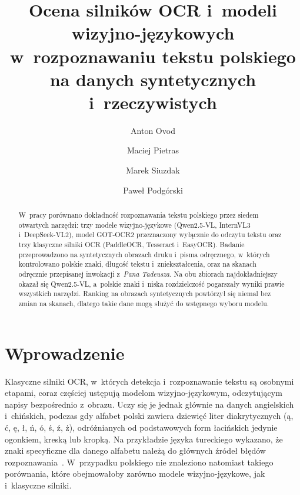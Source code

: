 \documentclass[runningheads,orivec]{llncs}
\begin{document}
\setlength{\emergencystretch}{1.5em}

\title{Ocena silników OCR i~modeli wizyjno-językowych w~rozpoznawaniu tekstu polskiego na danych syntetycznych i~rzeczywistych}
\author{Anton Ovod \and Maciej Pietras \and Marek Siuzdak \and Paweł Podgórski}

\maketitle

\begin{abstract}
W~pracy porównano dokładność rozpoznawania tekstu polskiego przez siedem otwartych narzędzi: trzy modele
wizyjno-językowe (\mbox{Qwen2.5-VL}, InternVL3 i~\mbox{DeepSeek-VL2}), model \mbox{GOT-OCR2} przeznaczony wyłącznie do odczytu tekstu oraz trzy klasyczne silniki OCR (PaddleOCR, Tesseract i~EasyOCR). Badanie przeprowadzono na syntetycznych obrazach druku i~pisma odręcznego, w~których kontrolowano polskie znaki, długość tekstu i~zniekształcenia, oraz na skanach odręcznie przepisanej inwokacji z~\emph{Pana Tadeusza}. Na obu zbiorach najdokładniejszy okazał się \mbox{Qwen2.5-VL}, a~polskie znaki i~niska rozdzielczość pogarszały wyniki prawie wszystkich narzędzi. Ranking na obrazach syntetycznych powtórzył się niemal bez zmian na skanach, dlatego takie dane mogą służyć do wstępnego wyboru modelu.
\end{abstract}

\section{Wprowadzenie}

Klasyczne silniki OCR, w~których detekcja i~rozpoznawanie tekstu są osobnymi etapami, coraz częściej ustępują
modelom wizyjno-językowym, odczytującym napisy bezpośrednio z~obrazu. Uczy się je jednak głównie na
danych angielskich i~chińskich, podczas gdy alfabet polski zawiera dziewięć liter diakrytycznych (ą, ć, ę, ł,
ń, ó, ś, ź, ż), odróżnianych od podstawowych form łacińskich jedynie ogonkiem, kreską lub kropką. Na przykładzie języka tureckiego wykazano, że znaki specyficzne dla
danego alfabetu należą do głównych źródeł błędów rozpoznawania~\cite{yilmaz2026}. W~przypadku polskiego nie
znaleziono natomiast takiego porównania, które obejmowałoby zarówno modele wizyjno-językowe, jak i~klasyczne silniki.
\end{document}
